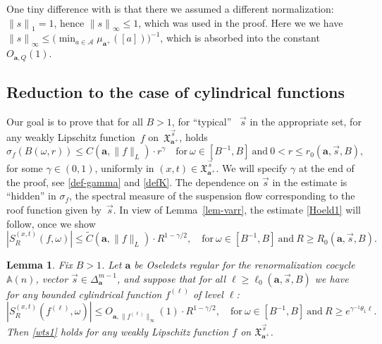 \documentclass[11pt]{article}
\numberwithin{equation}{section}\newcommand{\Relation}[2][]{}\newtheorem*{prop*}{Proposition}
\let\mathcal\mathscr
\theoremstyle{plain}
\newtheorem{lemma}[theorem]{Lemma}
\theoremstyle{definition}
\let\wt\widetilde
\newcommand\bom{{\boldsymbol a}}\let\ba\bom
\let\gam\gamma
\let\om\omega
\let\sig\sigma
\newcommand\Xx{\mathfrak{X}}
\newcommand\Ak{\mathcal{A}}
\newcommand\Aa{\mathbb{A}}
\newcommand\be{\begin{equation}}
\newcommand\ee{\end{equation}}
\begin{document}
One tiny difference with \cite[Prop.\,7.1]{BuSo18a} is that there we assumed a different normalization: ${\|s\|}_1=1$, hence ${\|s\|}_\infty\le 1$, which was used in the proof. Here we we have
${\|s\|}_\infty \le \bigl(\min_{a\in \Ak} \mu_{\bom^+}([a])\bigr)^{-1}$, which is absorbed into the constant $O_{\bom,Q}(1)$.

\subsection{Reduction to the case of cylindrical functions} \label{sec-reduc2}
Our goal is to prove that for all $B>1$, for ``typical'' \ $\vec{s}$ in the appropriate set, for any weakly Lipschitz function~$f$ on~$\Xx_{\bom^+}^{\vec{s}}$, holds
\be \label{Hoeld1}
\sig_f(B(\om,r)) \le C(\bom,\|f\|_L)\cdot r^\gam\quad \text{for}\ \om\in [B^{-1},B]\ \text{and}
\ 0 < r \le r_0(\bom,\vec{s}, B),
\ee
for some $\gam\in (0,1)$, uniformly in $(x,t)\in \Xx_{\bom^+}^{\vec{s}}$. We will specify $\gam$ at the end of the proof, see \eqref{def-gamma} and \eqref{defK}.
The dependence on $\vec{s}$ in the estimate is ``hidden'' in $\sig_f$, the spectral measure of the suspension flow corresponding to the roof function given by~$\vec{s}$.
In view of Lemma~\ref{lem-varr}, the estimate \eqref{Hoeld1} will follow, once we show
\be \label{wts1}
|S^{(x,t)}_R(f,\om)| \le \wt{C}(\bom,\|f\|_L)\cdot R^{1-\gam/2},\quad \text{for}\ \om\in [B^{-1},B]\ \text{and}\ R\ge R_0(\bom,\vec s, B).
\ee

\begin{lemma} \label{lem-reduc2}
Fix $B>1$. Let $\bom$ be Oseledets regular for the renormalization cocycle $\Aa(n)$, vector $\vec s\in \Delta_\bom^{m-1}$, and suppose that for all $\ell\ge \ell_0(\bom,\vec s,B)$ we have
for any bounded cylindrical function $f^{(\ell)}$ of level $\ell$:
\be \label{eq-wts111}
|S^{(x,t)}_R(f^{(\ell)},\om)| \le O_{\bom,\|f^{(\ell)}\|_\infty}(1)\cdot R^{1-\gam/2},\quad \text{for}\ \om\in [B^{-1},B]\ \text{and}\ R\ge e^{\gam^{-1}\theta_1 \ell}.
\ee
Then \eqref{wts1} holds for any weakly Lipschitz function $f$ on $\Xx_{\bom^+}^{\vec{s}}$.
\end{lemma}
\end{document}
